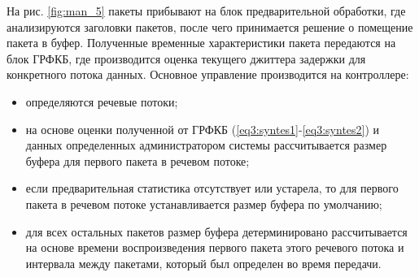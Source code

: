 На рис. \ref{fig:man_5} пакеты прибывают на блок предварительной обработки, где анализируются заголовки пакетов, после чего принимается решение о помещение пакета в буфер.
Полученные временные характеристики пакета передаются на блок ГРФКБ, где производится оценка текущего джиттера задержки для конкретного потока данных.
Основное управление производится на контроллере: 
\begin{itemize}
 \item определяются речевые потоки;
 \item на основе оценки полученной от ГРФКБ (\ref{eq3:syntes1}-\ref{eq3:syntes2}) и данных определенных администратором системы рассчитывается размер буфера для первого пакета в речевом потоке;
 \item если предварительная статистика отсутствует или устарела, то для первого пакета в речевом потоке устанавливается размер буфера по умолчанию;
 \item для всех остальных пакетов размер буфера детерминировано рассчитывается на основе времени воспроизведения первого пакета этого речевого потока и интервала между пакетами, который был определен во время передачи.
\end{itemize}


